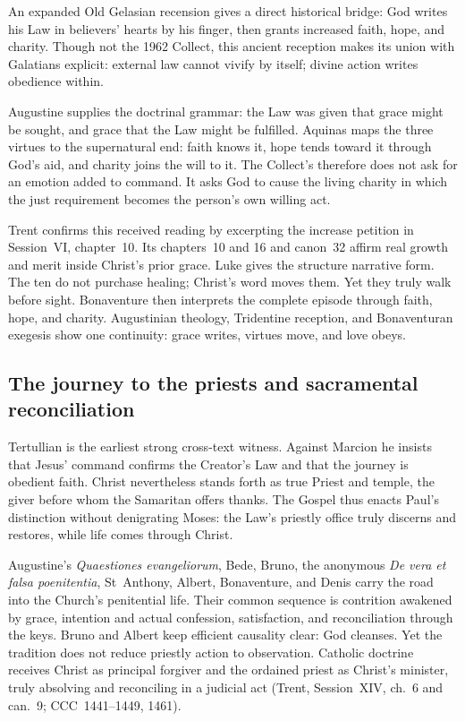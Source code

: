 \ifdefined\TriptychSynthesisEdition\else
An expanded Old Gelasian recension gives a direct historical bridge: God
writes his Law in believers' hearts by his finger, then grants increased
faith, hope, and charity. Though not the 1962 Collect, this ancient reception
makes its union with Galatians explicit: external law cannot vivify by itself;
divine action writes obedience within.
\fi

Augustine supplies the doctrinal grammar: the Law was given that grace might
be sought, and grace that the Law might be fulfilled. Aquinas maps the three
virtues to the supernatural end: faith knows it, hope tends toward it through
God's aid, and charity joins the will to it. The Collect's  therefore does not ask for an emotion added to command. It asks God to
cause the living charity in which the just requirement becomes the person's
own willing act.

Trent confirms this received reading by excerpting the increase petition in
Session~VI, chapter~10. Its chapters~10 and 16 and canon~32 affirm real growth
and merit inside Christ's prior grace. Luke gives the structure narrative
form. The ten do not purchase healing; Christ's word moves them. Yet they truly
walk before sight. Bonaventure then interprets the complete episode through
faith, hope, and charity. Augustinian theology, Tridentine reception, and
Bonaventuran exegesis show one continuity: grace writes, virtues move, and
love obeys.

\subsection*{The journey to the priests and sacramental reconciliation\enspace
  }

Tertullian is the earliest strong cross-text witness. Against Marcion he
insists that Jesus' command confirms the Creator's Law and that the journey is
obedient faith. Christ nevertheless stands forth as true Priest and temple,
the giver before whom the Samaritan offers thanks. The Gospel thus enacts
Paul's distinction without denigrating Moses: the Law's priestly office truly
discerns and restores, while life comes through Christ.

Augustine's \emph{Quaestiones evangeliorum}, Bede, Bruno, the anonymous
\emph{De vera et falsa poenitentia}, St~Anthony, Albert, Bonaventure, and Denis
carry the road into the Church's penitential life. Their common sequence is
contrition awakened by grace, intention and actual confession, satisfaction,
and reconciliation through the keys. Bruno and Albert keep efficient causality
clear: God cleanses. Yet the tradition does not reduce priestly action to
observation. Catholic doctrine receives Christ as principal forgiver and the
ordained priest as Christ's minister, truly absolving and reconciling in a
judicial act (Trent, Session~XIV, ch.~6 and can.~9; CCC~1441--1449, 1461).

